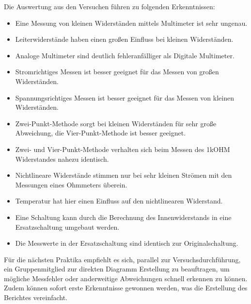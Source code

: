 Die Auswertung aus den Versuchen führen zu folgenden Erkenntnissen:
\begin{itemize}
  \item Eine Messung von kleinen Widerständen mittels Multimeter ist sehr ungenau.
  \item Leiterwiderstände haben einen großen Einfluss bei kleinen Widerständen.
  \item Analoge Multimeter sind deutlich fehleranfälliger als Digitale Multimeter.
  \item Stromrichtiges Messen ist besser geeignet für das Messen von großen Widerständen.
  \item Spannungsrichtiges Messen ist besser geeignet für das Messen von kleinen Widerständen.
  \item Zwei-Punkt-Methode sorgt bei kleinen Widerständen für sehr große Abweichung, die Vier-Punkt-Methode ist besser geeignet.
  \item Zwei- und Vier-Punkt-Methode verhalten sich beim Messen des 1kOHM Widerstandes nahezu identisch.
  \item Nichtlineare Widerstände stimmen nur bei sehr kleinen Strömen mit den Messungen eines Ohmmeters überein.
  \item Temperatur hat hier einen Einfluss auf den nichtlinearen Widerstand.
  \item Eine Schaltung kann durch die Berechnung des Innenwiderstands in eine Ersatzschaltung umgebaut werden.
  \item Die Messwerte in der Ersatzschaltung sind identisch zur Originalschaltung.
\end{itemize}
Für die nächsten Praktika empfiehlt es sich, parallel zur Versuchsdurchführung, ein Gruppenmitglied zur direkten Diagramm Erstellung zu beauftragen, um mögliche Messfehler oder anderweitige Abweichungen schnell erkennen zu können.
Zudem können sofort erste Erkenntnisse gewonnen werden, was die Erstellung des Berichtes vereinfacht.
